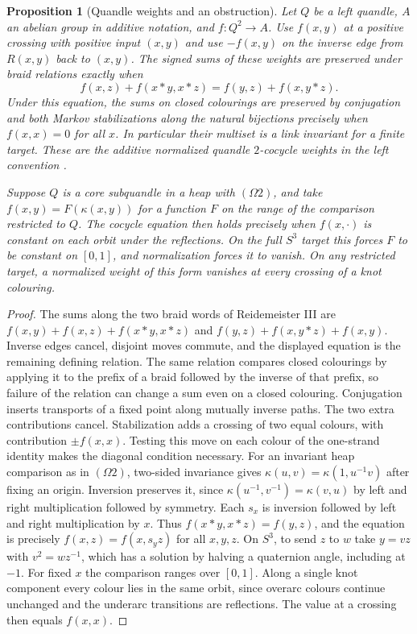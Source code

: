 \documentclass[11pt,reqno]{amsart}
\newtheorem{proposition}[theorem]{Proposition}
\theoremstyle{definition}
\theoremstyle{remark}
\numberwithin{equation}{section}
\begin{document}
\begin{proposition}[Quandle weights and an obstruction]\label{m7:cocycle}
Let $Q$ be a left quandle, $A$ an abelian group in additive notation,
and $f:Q^2\to A$.
Use $f(x,y)$ at a positive crossing with positive input $(x,y)$ and
use $-f(x,y)$ on the inverse edge from $R(x,y)$ back to $(x,y)$.
The signed sums of these weights are preserved under braid relations
exactly when
\[
 f(x,z)+f(x*y,x*z)=f(y,z)+f(x,y*z).
\]
Under this equation, the sums on closed colourings are preserved by
conjugation and both Markov stabilizations along the natural
bijections precisely when $f(x,x)=0$ for all $x$. In particular their
multiset is a link invariant for a finite target. These are the
additive normalized quandle $2$-cocycle weights in the left convention
\cite{m7:CJKLS}.

Suppose $Q$ is a core subquandle in a heap with $(\Omega2)$, and take
$f(x,y)=F(\kappa(x,y))$ for a function $F$ on the range of the comparison
restricted to $Q$. The cocycle equation then holds
precisely when $f(x,\cdot)$ is constant on each orbit under the
reflections. On the full $S^3$ target this forces $F$ to be constant
on $[0,1]$, and normalization forces it to vanish. On any restricted
target, a normalized weight of this form vanishes at every crossing
of a knot colouring.
\end{proposition}
\begin{proof}
The sums along the two braid words of Reidemeister III are
$f(x,y)+f(x,z)+f(x*y,x*z)$ and
$f(y,z)+f(x,y*z)+f(x,y)$. Inverse edges cancel, disjoint moves commute,
and the displayed equation is the remaining defining relation.
The same relation compares closed colourings by applying it to the
prefix of a braid followed by the inverse of that prefix, so failure
of the relation can change a sum even on a closed colouring.
Conjugation inserts transports of a fixed point along mutually
inverse paths. The two extra contributions cancel. Stabilization
adds a crossing of two equal colours, with contribution $\pm f(x,x)$.
Testing this move on each colour of the one-strand identity makes the
diagonal condition necessary.
For an invariant heap comparison as in $(\Omega2)$, two-sided
invariance gives
$\kappa(u,v)=\kappa(1,u^{-1}v)$ after fixing an origin.
Inversion preserves it, since $\kappa(u^{-1},v^{-1})=\kappa(v,u)$ by
left and right multiplication followed by symmetry.
Each $s_x$ is inversion followed by left and right multiplication by
$x$. Thus $f(x*y,x*z)=f(y,z)$, and the equation is precisely
$f(x,z)=f(x,s_yz)$ for all $x,y,z$. On $S^3$, to send $z$ to $w$ take
$y=vz$ with $v^2=wz^{-1}$, which has a solution by halving a
quaternion angle, including at $-1$. For fixed $x$ the comparison
ranges over $[0,1]$. Along a single knot component every colour lies in
the same orbit, since overarc colours continue unchanged and the
underarc transitions are reflections. The value at a crossing then
equals $f(x,x)$.
\end{proof}
\end{document}
